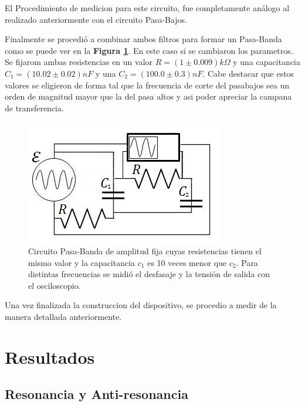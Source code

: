 \documentclass[11pt,a4paper]{article}
\begin{document}
El Procedimiento de medicion para este circuito, fue completamente análogo al realizado anteriormente con el circuito Pasa-Bajos. 

Finalmente se procedió a combinar ambos filtros para formar un Pasa-Banda como se puede ver en la \textbf{Figura \ref{fig:RC-PBD}}. En este caso si se cambiaron los parametros. Se fijarom ambas resistencias en un valor $R = (1 \pm 0.009)k\Omega$ y una capacitancia $C_{1} = (10.02 \pm 0.02)nF$ y una $C_{2} = (100.0 \pm 0.3)nF$. Cabe destacar que estos valores se eligieron de forma tal que la frecuencia de corte del pasabajos sea un orden de magnitud mayor que la del pasa altos y asi poder apreciar la campana de transferencia. 

\begin{figure}[h]
\centering
\includegraphics[scale=0.8]{Circuito-RC-Pasa-Banda}
  \caption{Circuito Pasa-Banda de amplitud fija cuyas resistencias tienen el mismo valor y la capacitancia $c_{1}$ es 10 veces menor que $c_{2}$. Para distintas frecuencias se midió el desfasaje y la tensión de salida con el osciloscopio.}
  \label{fig:RC-PBD}
\end{figure}

Una vez finalizada la construccion del dispositivo, se procedio a medir de la manera detallada anteriormente.



\section{Resultados}


\subsection{Resonancia y Anti-resonancia}
\end{document}
